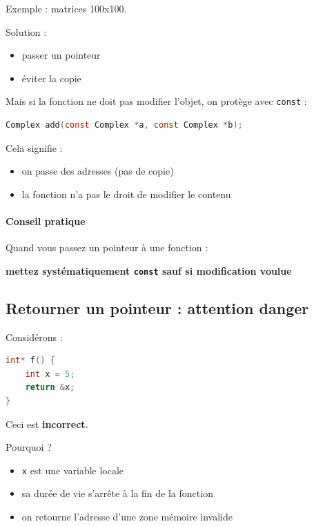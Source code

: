 Exemple : matrices 100x100.

Solution :

\begin{itemize}
    \item passer un pointeur
    \item éviter la copie
\end{itemize}

Mais si la fonction ne doit pas modifier l’objet,
on protège avec \texttt{const} :

\begin{lstlisting}[language=C]
Complex add(const Complex *a, const Complex *b);
\end{lstlisting}

Cela signifie :

\begin{itemize}
    \item on passe des adresses (pas de copie)
    \item la fonction n’a pas le droit de modifier le contenu
\end{itemize}

\paragraph{Conseil pratique}

Quand vous passez un pointeur à une fonction :

\begin{center}
\textbf{mettez systématiquement \texttt{const} sauf si modification voulue}
\end{center}

\subsection{Retourner un pointeur : attention danger}

Considérons :

\begin{lstlisting}[language=C]
int* f() {
    int x = 5;
    return &x;
}
\end{lstlisting}

Ceci est \textbf{incorrect}.

Pourquoi ?

\begin{itemize}
    \item \texttt{x} est une variable locale
    \item sa durée de vie s’arrête à la fin de la fonction
    \item on retourne l’adresse d’une zone mémoire invalide
\end{itemize}

